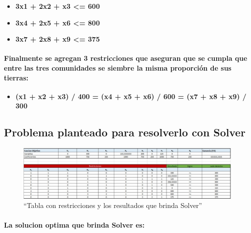 \documentclass[
]{article}
\providecommand{\tightlist}{%
  \setlength{\itemsep}{0pt}\setlength{\parskip}{0pt}}
\begin{document}
\begin{itemize}
\tightlist
\item
  \textbf{3x1 + 2x2 + x3 \textless= 600}
\item
  \textbf{3x4 + 2x5 + x6 \textless= 800}
\item
  \textbf{3x7 + 2x8 + x9 \textless= 375}
\end{itemize}

\hypertarget{finalmente-se-agregan-3-restricciones-que-aseguran-que-se-cumpla-que-entre-las-tres-comunidades-se-siembre-la-misma-proporciuxf3n-de-sus-tierras}{%
\paragraph{Finalmente se agregan 3 restricciones que aseguran que se
cumpla que entre las tres comunidades se siembre la misma proporción de
sus
tierras:}\label{finalmente-se-agregan-3-restricciones-que-aseguran-que-se-cumpla-que-entre-las-tres-comunidades-se-siembre-la-misma-proporciuxf3n-de-sus-tierras}}

\begin{itemize}
\tightlist
\item
  \textbf{(x1 + x2 + x3) / 400 = (x4 + x5 + x6) / 600 = (x7 + x8 + x9) /
  300}
\end{itemize}

\hypertarget{problema-planteado-para-resolverlo-con-solver}{%
\subsection{Problema planteado para resolverlo con
Solver}\label{problema-planteado-para-resolverlo-con-solver}}

\begin{figure}
\centering
\includegraphics{img2.jpeg}
\caption{``Tabla con restricciones y los resultados que brinda Solver''}
\end{figure}

\hypertarget{la-solucion-optima-que-brinda-solver-es}{%
\paragraph{La solucion optima que brinda Solver
es:}\label{la-solucion-optima-que-brinda-solver-es}}
\end{document}
